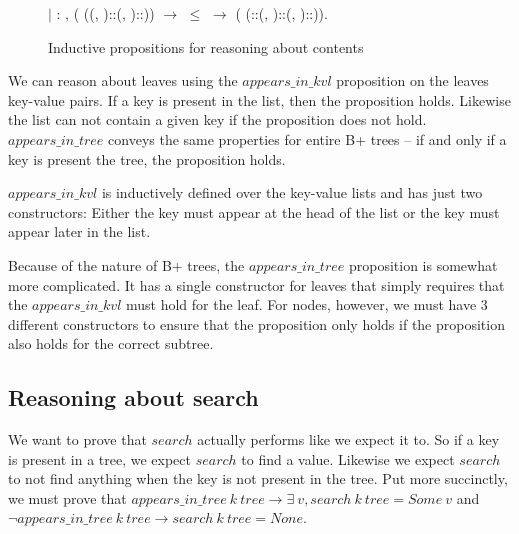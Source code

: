 \begin{figure}
\begin{coqdoccode}
  \coqdocindent{1.00em}
  \ensuremath{|} : \coqdockw{\ensuremath{\forall}}      ,\coqdoceol
  \coqdocindent{8.00em}
    (   ((, )::(, )::)) \ensuremath{\rightarrow} \coqdoceol
  \coqdocindent{8.00em}
   \ensuremath{\le}  \ensuremath{\rightarrow}\coqdoceol
  \coqdocindent{8.00em}
    (   (::(, )::(, )::)).\coqdoceol
  \end{coqdoccode}
\caption{Inductive propositions for reasoning about contents}
\label{fig:aik_and_ait}
\end{figure}

We can reason about leaves using the $appears\_in\_kvl$ proposition on the leaves key-value pairs. If a key is present in the list, then the proposition holds. Likewise the list can not contain a given key if the proposition does not hold. $appears\_in\_tree$ conveys the same properties for entire B+ trees -- if and only if a key is present the tree, the proposition holds.

$appears\_in\_kvl$ is inductively defined over the key-value lists and has just two constructors: Either the key must appear at the head of the list or the key must appear later in the list.

Because of the nature of B+ trees, the $appears\_in\_tree$ proposition is somewhat more complicated. It has a single constructor for leaves that simply requires that the $appears\_in\_kvl$ must hold for the leaf. For nodes, however, we must have 3 different constructors to ensure that the proposition only holds if the proposition also holds for the correct subtree.

\subsection{Reasoning about search}
We want to prove that $search$ actually performs like we expect it to. So if a key is present in a tree, we expect $search$ to find a value. Likewise we expect $search$ to not find anything when the key is not present in the tree.
Put more succinctly, we must prove that $appears\_in\_tree~k~tree \rightarrow \exists~v, search~k~tree = Some~v$ and $\lnot appears\_in\_tree~k~tree \rightarrow search~k~tree = None$.

